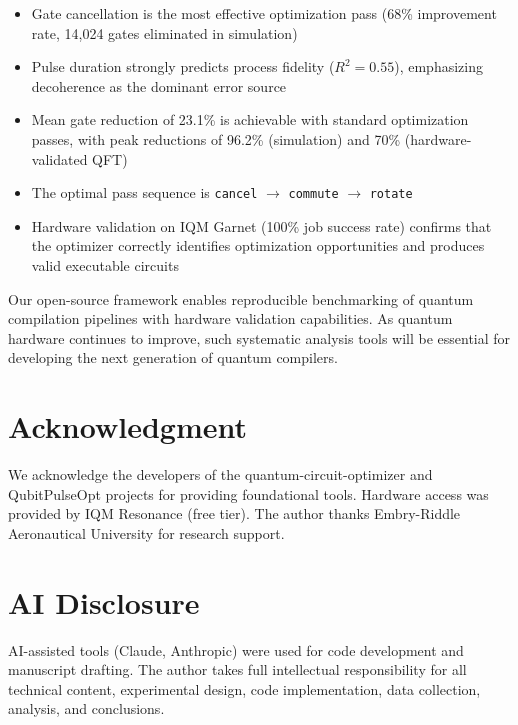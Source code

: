 \documentclass[journal]{IEEEtran}
\begin{document}
\begin{itemize}
    \item Gate cancellation is the most effective optimization pass (68\% improvement rate, 14,024 gates eliminated in simulation)
    \item Pulse duration strongly predicts process fidelity ($R^2 = 0.55$), emphasizing decoherence as the dominant error source
    \item Mean gate reduction of 23.1\% is achievable with standard optimization passes, with peak reductions of 96.2\% (simulation) and 70\% (hardware-validated QFT)
    \item The optimal pass sequence is \texttt{cancel} $\rightarrow$ \texttt{commute} $\rightarrow$ \texttt{rotate}
    \item Hardware validation on IQM Garnet (100\% job success rate) confirms that the optimizer correctly identifies optimization opportunities and produces valid executable circuits
\end{itemize}

Our open-source framework enables reproducible benchmarking of quantum compilation pipelines with hardware validation capabilities. As quantum hardware continues to improve, such systematic analysis tools will be essential for developing the next generation of quantum compilers.

\section*{Acknowledgment}

We acknowledge the developers of the quantum-circuit-optimizer and QubitPulseOpt projects for providing foundational tools. Hardware access was provided by IQM Resonance (free tier). The author thanks Embry-Riddle Aeronautical University for research support.

\section*{AI Disclosure}

AI-assisted tools (Claude, Anthropic) were used for code development and manuscript drafting. The author takes full intellectual responsibility for all technical content, experimental design, code implementation, data collection, analysis, and conclusions.
\end{document}
